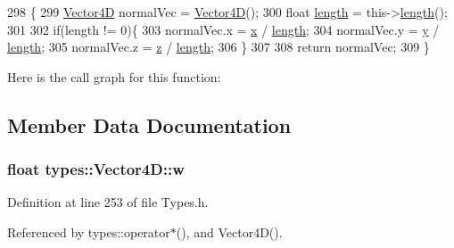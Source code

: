 \begin{DoxyCode}
298                             \{
299             \hyperlink{structtypes_1_1_vector4_d_a0df265dd69de197b5259c7bb3a5d4fab}{Vector4D} normalVec = \hyperlink{structtypes_1_1_vector4_d_a0df265dd69de197b5259c7bb3a5d4fab}{Vector4D}();
300             \textcolor{keywordtype}{float} \hyperlink{structtypes_1_1_vector4_d_a9e935c0af1c2779e6ad6cf64386076ba}{length} = this->\hyperlink{structtypes_1_1_vector4_d_a9e935c0af1c2779e6ad6cf64386076ba}{length}();
301 
302             \textcolor{keywordflow}{if}(length != 0)\{
303                 normalVec.x = \hyperlink{structtypes_1_1_vector4_d_a00b1b79bf63dc9b91d3100bbceb8b061}{x} / \hyperlink{structtypes_1_1_vector4_d_a9e935c0af1c2779e6ad6cf64386076ba}{length};
304                 normalVec.y = \hyperlink{structtypes_1_1_vector4_d_ae3bf75e7f1e4430aecab11f181c53b61}{y} / \hyperlink{structtypes_1_1_vector4_d_a9e935c0af1c2779e6ad6cf64386076ba}{length};
305                 normalVec.z = \hyperlink{structtypes_1_1_vector4_d_a6384f3ff311fbdd2ed4e88d6ec548130}{z} / \hyperlink{structtypes_1_1_vector4_d_a9e935c0af1c2779e6ad6cf64386076ba}{length};
306             \}
307 
308             \textcolor{keywordflow}{return} normalVec;
309         \}
\end{DoxyCode}


Here is the call graph for this function\+:




\subsection{Member Data Documentation}
\hypertarget{structtypes_1_1_vector4_d_a701a06571f4bf043defa2d19d086dcc1}{}
\subsubsection[{w}]{\setlength{\rightskip}{0pt plus 5cm}float types\+::\+Vector4\+D\+::w}\label{structtypes_1_1_vector4_d_a701a06571f4bf043defa2d19d086dcc1}


Definition at line 253 of file Types.\+h.



Referenced by types\+::operator$\ast$(), and Vector4\+D().

\hypertarget{structtypes_1_1_vector4_d_a00b1b79bf63dc9b91d3100bbceb8b061}{}

